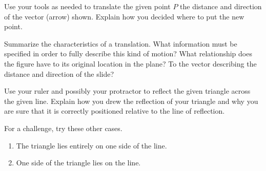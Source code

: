 \documentclass[nooutcomes,noauthor, handout]{ximera}
\begin{document}
\begin{problem}
Use your tools as needed to translate the given point $P$ the distance and direction of the vector (arrow) shown.  Explain how you decided where to put the new point.\\
\vskip 1.5in

\begin{image}
\end{image}

\end{problem}
\vfill
\begin{problem}
Summarize the characteristics of a translation.  What information must be specified in order to fully describe this kind of motion?  What relationship does the figure have to its original location in the plane? To the vector describing the distance and direction of the slide?
\end{problem}
\newpage 



\begin{problem}
Use your ruler and possibly your protractor to reflect the given triangle across the given line. Explain how you drew the reflection of your triangle and why you are sure that it is correctly positioned relative to the line of reflection.\

\vskip 1in

\begin{image}
\end{image}



\vfill
For a challenge, try these other cases.
\begin{enumerate}
    \item The triangle lies entirely on one side of the line.
    \item One side of the triangle lies on the line.
\end{enumerate}

\end{problem}
\end{document}
